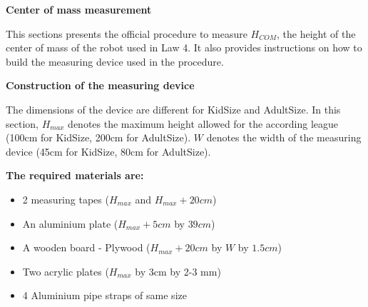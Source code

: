 \clearpage
\sffamily
{\bfseries\color[rgb]{0.4,0.4,0.4} Center of mass measurement}
{}

\bigskip

This sections presents the official procedure to measure $H_{COM}$,
the height of the center of mass of the robot used in Law 4.
It also provides instructions on how to build the measuring device used in the
procedure.

\bigskip

{\bfseries Construction of the measuring device}

\headlinebox

The dimensions of the device are different for KidSize and AdultSize.
In this section, $H_{max}$ denotes the maximum height allowed for the
according league (100cm for KidSize, 200cm for AdultSize).
$W$ denotes the width of the measuring device (45cm for KidSize, 80cm for
AdultSize).

\bigskip

\textbf{The required materials are:}
\begin{itemize}
\item 2 measuring tapes ($H_{max}$ and $H_{max} + 20cm$)
\item An aluminium plate ($H_{max}+5cm$ by $39cm$)
\item A wooden board - Plywood ($H_{max}+20cm$ by $W$ by $1.5cm$)
\item Two acrylic plates ($H_{max}$ by 3cm by 2-3 mm)
\item 4 Aluminium pipe straps of same size
\end{itemize}


